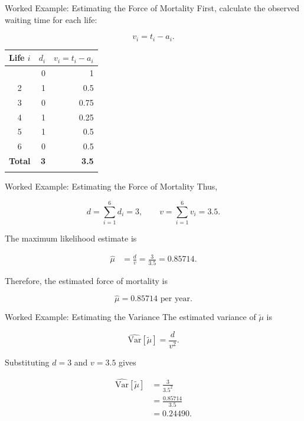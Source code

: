 \documentclass[
  ignorenonframetext,
  aspectratio=169,
]{beamer}
\newcounter{none} %
\begin{document}
\begin{frame}{Worked Example: Estimating the Force of Mortality}
\protect{}\label{worked-example-estimating-the-force-of-mortality-1}
First, calculate the observed waiting time for each life:

\[
v_i=t_i-a_i.
\]

{\def\LTcaptype{none} %
\begin{longtable}[]{@{}crr@{}}
\toprule\noalign{}
Life \(i\) & \(d_i\) & \(v_i=t_i-a_i\) \\
\midrule\noalign{}
\endhead
1 & 0 & 1 \\
2 & 1 & 0.5 \\
3 & 0 & 0.75 \\
4 & 1 & 0.25 \\
5 & 1 & 0.5 \\
6 & 0 & 0.5 \\
\textbf{Total} & \textbf{3} & \textbf{3.5} \\
\bottomrule\noalign{}
\end{longtable}
}
\end{frame}

\begin{frame}{Worked Example: Estimating the Force of Mortality}
\protect{}\label{worked-example-estimating-the-force-of-mortality-2}
Thus,

\[
d=\sum_{i=1}^{6}d_i=3, \quad \quad v=\sum_{i=1}^{6}v_i=3.5.
\]

The maximum likelihood estimate is

\[
\begin{aligned}
\hat{\mu}
&=\frac{d}{v} =\frac{3}{3.5} =0.85714.
\end{aligned}
\]

Therefore, the estimated force of mortality is

\[\boxed{\hat{\mu}=0.85714\text{ per year}.}\]
\end{frame}

\begin{frame}{Worked Example: Estimating the Variance}
\protect{}\label{worked-example-estimating-the-variance}
The estimated variance of \(\tilde{\mu}\) is

\[
\widehat{\mathrm{Var}}[\tilde{\mu}]
=\frac{d}{v^2}.
\]

Substituting \(d=3\) and \(v=3.5\) gives

\[
\begin{aligned}
\widehat{\mathrm{Var}}[\tilde{\mu}]
&=\frac{3}{3.5^2}\\
&=\frac{0.85714}{3.5}\\
&=0.24490.
\end{aligned}
\]
\end{frame}
\end{document}
